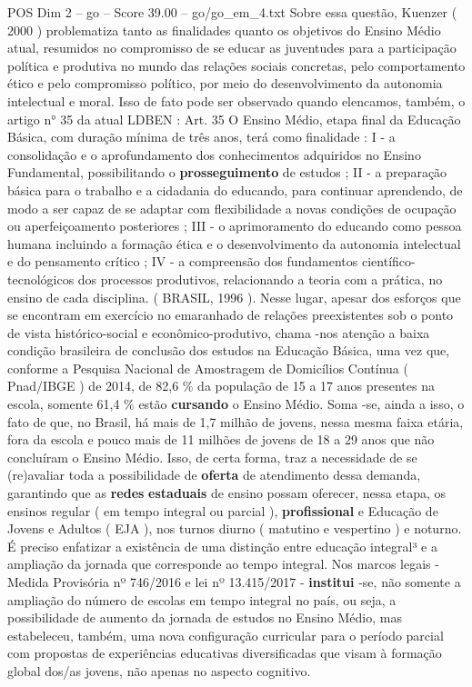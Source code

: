 \begin{textsample}{POS Dim 2 – go – Score 39.00 – go/go\_em\_4.txt}
Sobre essa questão, Kuenzer ( 2000 ) problematiza tanto as finalidades quanto os objetivos do Ensino Médio atual, resumidos no compromisso de se educar as juventudes para a participação política e produtiva no mundo das relações sociais concretas, pelo comportamento ético e pelo compromisso político, por meio do desenvolvimento da autonomia intelectual e moral.
Isso de fato pode ser observado quando elencamos, também, o artigo n{\EmojiFont °} 35 da atual LDBEN : Art. 35 O Ensino Médio, etapa final da Educação Básica, com duração mínima de três anos, terá como finalidade : I - a consolidação e o aprofundamento dos conhecimentos adquiridos no Ensino Fundamental, possibilitando o \textbf{prosseguimento} de estudos ; II - a preparação básica para o trabalho e a cidadania do educando, para continuar aprendendo, de modo a ser capaz de se adaptar com flexibilidade a novas condições de ocupação ou aperfeiçoamento posteriores ; III - o aprimoramento do educando como pessoa humana incluindo a formação ética e o desenvolvimento da autonomia intelectual e do pensamento crítico ; IV - a compreensão dos fundamentos científico-tecnológicos dos processos produtivos, relacionando a teoria com a prática, no ensino de cada disciplina. ( BRASIL, 1996 ).
Nesse lugar, apesar dos esforços que se encontram em exercício no emaranhado de relações preexistentes sob o ponto de vista histórico-social e econômico-produtivo, chama -nos atenção a baixa condição brasileira de conclusão dos estudos na Educação Básica, uma vez que, conforme a Pesquisa Nacional de Amostragem de Domicílios Contínua ( Pnad/IBGE ) de 2014, de 82,6 \% da população de 15 a 17 anos presentes na escola, somente 61,4 \% estão \textbf{cursando} o Ensino Médio.
Soma -se, ainda a isso, o fato de que, no Brasil, há mais de 1,7 milhão de jovens, nessa mesma faixa etária, fora da escola e pouco mais de 11 milhões de jovens de 18 a 29 anos que não concluíram o Ensino Médio.
Isso, de certa forma, traz a necessidade de se (re)avaliar toda a possibilidade de \textbf{oferta} de atendimento dessa demanda, garantindo que as \textbf{redes} \textbf{estaduais} de ensino possam oferecer, nessa etapa, os ensinos regular ( em tempo integral ou parcial ), \textbf{profissional} e Educação de Jovens e Adultos ( EJA ), nos turnos diurno ( matutino e vespertino ) e noturno.
É preciso enfatizar a existência de uma distinção entre educação integral³ e a ampliação da jornada que corresponde ao tempo integral.
Nos marcos legais - Medida Provisória nº 746/2016 e lei nº 13.415/2017 - \textbf{institui} -se, não somente a ampliação do número de escolas em tempo integral no país, ou seja, a possibilidade de aumento da jornada de estudos no Ensino Médio, mas estabeleceu, também, uma nova configuração curricular para o período parcial com propostas de experiências educativas diversificadas que visam à formação global dos/as jovens, não apenas no aspecto cognitivo.

\end{textsample}
